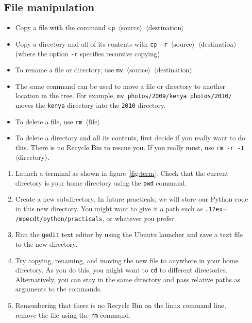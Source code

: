 \documentclass[a4paper,twoside,titlepage]{memoir}
\makeatletter
\newcommand{\FrameTitle}[2]{%
  \fboxrule=\FrameRule \fboxsep=\FrameSep
  \fbox{\vbox{\nobreak \vskip -0.7\FrameSep
    \rlap{\centerline{\strut#1}}\nobreak\nointerlineskip%
    \vskip 0.7\FrameSep
    \hbox{#2}}}}
\newenvironment{framewithtitle}[2][\FrameFirst@Lab\ (cont.)]{%
  \def\FrameFirst@Lab{\textbf{#2}}%
  \def\FrameCont@Lab{\textbf{#1}}%
  \def\FrameCommand##1{%
    \FrameTitle{\FrameFirst@Lab}{##1}}%
  \def\FirstFrameCommand##1{%
    \FrameTitle{\FrameFirst@Lab}{##1}}%
  \def\MidFrameCommand##1{%
    \FrameTitle{\FrameCont@Lab}{##1}}%
  \def\LastFrameCommand##1{%
    \FrameTitle{\FrameCont@Lab}{##1}}%
\MakeFramed{\advance\hsize-\width \FrameRestore}}%
{\endMakeFramed}
\newcounter{exercisectr}
\newenvironment{exercise}
{\stepcounter{exercisectr}\begin{framewithtitle}{Practical \arabic{exercisectr}}}
{\end{framewithtitle}}
\newcommand{\shellcmd}{\texttt}
\newcommand{\shellvar}[1]{$\langle \text{#1}\rangle$}
\newcommand{\home}{\raise.17ex\hbox{$\scriptstyle\mathtt{\sim}$}}
\makeatother
\begin{document}
\subsection{File manipulation}
\begin{itemize}
\item Copy a file with the command \shellcmd{cp \shellvar{source} \shellvar{destination}}
\index{cp@\shellcmd{cp}}
\item Copy a directory and all of its contents with \shellcmd{cp -r \shellvar{source} \shellvar{destination}} (where the option \shellcmd{-r} specifies recursive copying)
\item To rename a file or directory, use \shellcmd{mv \shellvar{source} \shellvar{destination}}
\index{mv@\shellcmd{mv}}
\item The same command can be used to move a file or directory to another location in the tree.  For example, \shellcmd{mv photos/2009/kenya photos/2010/} moves the \shellcmd{kenya} directory into the \shellcmd{2010} directory.
\item To delete a file, use \shellcmd{rm \shellvar{file}}
\index{rm@\shellcmd{rm}}
\item To delete a directory and all its contents, first decide if you really want to do this.  There is no Recycle Bin to rescue you.  If you really must, use \shellcmd{rm -r -I \shellvar{directory}}.
\end{itemize}

\begin{exercise}
\begin{enumerate}
	\item Launch a terminal as shown in figure~\ref{fig:term}.  Check that the current directory is your home directory using the \shellcmd{pwd} command.
	\item Create a new subdirectory.  In future practicals, we will store our Python code in this new directory.  You might want to give it a path such as \shellcmd{\home/mpecdt/python/practicals}, or whatever you prefer.
	\item Run the \shellcmd{gedit} text editor by using the Ubuntu launcher and save a text file to the new directory.
	\item Try copying, renaming, and moving the new file to anywhere in your home directory.  As you do this, you might want to \shellcmd{cd} to different directories.  Alternatively, you can stay in the same directory and pass relative paths as arguments to the commands.
	\item Remembering that there is no Recycle Bin on the linux command line, remove the file using the \shellcmd{rm} command.
\end{enumerate}
\end{exercise}
\end{document}
